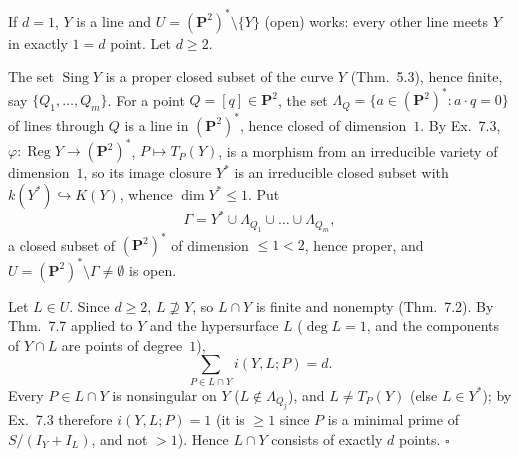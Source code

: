 \documentclass[11pt]{article}
\begin{document}
\pf
If $d=1$, $Y$ is a line and $U=(\mathbf P^2)^*\setminus\{Y\}$ (open) works: every other line meets $Y$ in exactly $1=d$ point. Let $d\ge2$.

The set $\operatorname{Sing}Y$ is a proper closed subset of the curve $Y$ (Thm.~5.3), hence finite, say $\{Q_1,\dots,Q_m\}$. For a point $Q=[q]\in\mathbf P^2$, the set $\Lambda_Q=\{a\in(\mathbf P^2)^*:a\cdot q=0\}$ of lines through $Q$ is a line in $(\mathbf P^2)^*$, hence closed of dimension~$1$. By Ex.~7.3, $\varphi:\operatorname{Reg}Y\to(\mathbf P^2)^*$, $P\mapsto T_P(Y)$, is a morphism from an irreducible variety of dimension~$1$, so its image closure $Y^*$ is an irreducible closed subset with $k(Y^*)\hookrightarrow K(Y)$, whence $\dim Y^*\le1$. Put
\[
\Gamma=Y^*\cup\Lambda_{Q_1}\cup\dots\cup\Lambda_{Q_m},
\]
a closed subset of $(\mathbf P^2)^*$ of dimension $\le1<2$, hence proper, and $U=(\mathbf P^2)^*\setminus\Gamma\ne\emptyset$ is open.

Let $L\in U$. Since $d\ge2$, $L\not\supseteq Y$, so $L\cap Y$ is finite and nonempty (Thm.~7.2). By Thm.~7.7 applied to $Y$ and the hypersurface $L$ ($\deg L=1$, and the components of $Y\cap L$ are points of degree~$1$),
\[
\sum_{P\in L\cap Y}i(Y,L;P)=d.
\]
Every $P\in L\cap Y$ is nonsingular on $Y$ ($L\notin\Lambda_{Q_j}$), and $L\ne T_P(Y)$ (else $L\in Y^*$); by Ex.~7.3 therefore $i(Y,L;P)=1$ (it is $\ge1$ since $P$ is a minimal prime of $S/(I_Y+I_L)$, and not $>1$). Hence $L\cap Y$ consists of exactly $d$ points. \hfill$\square$
\end{document}
